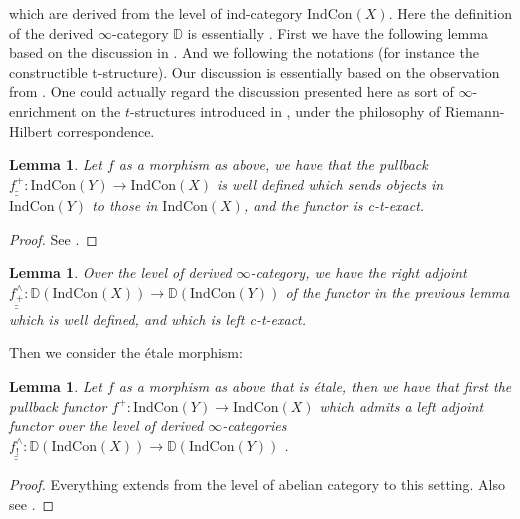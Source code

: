 \documentclass[11pt]{book}
\newtheorem{lemma}[theorem]{Lemma}
\theoremstyle{definition}
\numberwithin{equation}{section}
\begin{document}
which are derived from the level of ind-category $\mathrm{Ind}\mathrm{Con}(X)$. Here the definition of the derived $\infty$-category $\mathbb{D}$ is essentially \cite[Section 1.3.5]{Lurie2}. First we have the following lemma based on the discussion in \cite{Abe1}. And we following the notations (for instance the constructible t-structure). Our discussion is essentially based on the observation from \cite[Section 1.2]{Abe1}. One could actually regard the discussion presented here as sort of $\infty$-enrichment on the $t$-structures introduced in \cite{Abe1}, under the philosophy of Riemann-Hilbert correspondence.




\begin{lemma}
Let $f$ as a morphism as above, we have that the pullback $\underline{\underline{f^+}}: \mathrm{Ind}\mathrm{Con}(Y)\rightarrow \mathrm{Ind}\mathrm{Con}(X)$ is well defined which sends objects in $\mathrm{Ind}\mathrm{Con}(Y)$ to those in $\mathrm{Ind}\mathrm{Con}(X)$, and the functor is c-t-exact. 
\end{lemma}





\begin{proof}
See \cite[Section 1.3]{Abe1}.
\end{proof}



\begin{lemma}
Over the level of derived $\infty$-category, we have the right adjoint $\underline{\underline{f^\wedge_{+}}}: \mathbb{D}(\mathrm{Ind}\mathrm{Con}(X))\rightarrow \mathbb{D}(\mathrm{Ind}\mathrm{Con}(Y))$ of the functor in the previous lemma which is well defined, and which is left c-t-exact.	
\end{lemma}




\indent Then we consider the \'etale morphism:

\begin{lemma}
Let $f$ as a morphism as above that is \'etale, then we have that first the pullback functor $f^+:\mathrm{Ind}\mathrm{Con}(Y)\rightarrow \mathrm{Ind}\mathrm{Con}(X)$ which admits a left adjoint functor over the level of derived $\infty$-categories $\underline{\underline{f^\wedge_{!}}}: \mathbb{D}(\mathrm{Ind}\mathrm{Con}(X))\rightarrow \mathbb{D}(\mathrm{Ind}\mathrm{Con}(Y))$ .	
\end{lemma}


\begin{proof}
Everything extends from the level of abelian category to this setting. Also see \cite[Section 1.2.2]{Abe1}.	
\end{proof}
\end{document}
